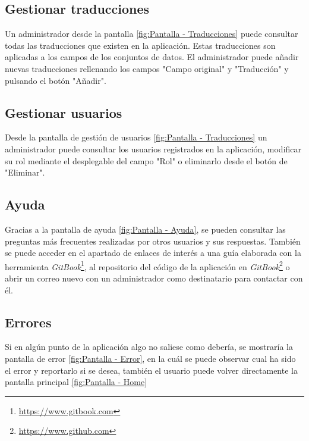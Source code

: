 \subsection{Gestionar traducciones}\label{gestión-traducciones}
Un administrador desde la pantalla \ref{fig:Pantalla - Traducciones} puede consultar todas las traducciones que existen en la aplicación. Estas traducciones son aplicadas a los campos de los conjuntos de datos.
El administrador puede añadir nuevas traducciones rellenando los campos "Campo original" y "Traducción" y pulsando el botón "Añadir".

\subsection{Gestionar usuarios}\label{gestión-usuarios}
Desde la pantalla de gestión de usuarios \ref{fig:Pantalla - Traducciones} un administrador puede consultar los usuarios registrados en la aplicación, modificar su rol mediante el desplegable del campo "Rol" o eliminarlo desde el botón de "Eliminar".

\subsection{Ayuda}\label{consulta-ayuda}
Gracias a la pantalla de ayuda \ref{fig:Pantalla - Ayuda}, se pueden consultar las preguntas más frecuentes realizadas por otros usuarios y sus respuestas. También se puede acceder en el apartado de enlaces de interés a una guía elaborada con la herramienta \textit{GitBook}\footnote{\url{https://www.gitbook.com}}, al repositorio del código de la aplicación en \textit{GitBook}\footnote{\url{https://www.github.com}} o abrir un correo nuevo con un administrador como destinatario para contactar con él.

\subsection{Errores}\label{errores}
Si en algún punto de la aplicación algo no saliese como debería, se mostraría la pantalla de error \ref{fig:Pantalla - Error}, en la cuál se puede observar cual ha sido el error y reportarlo si se desea, también el usuario puede volver directamente la pantalla principal \ref{fig:Pantalla - Home}
